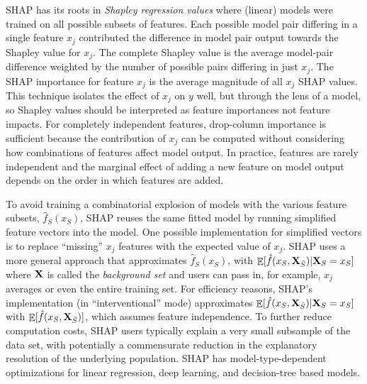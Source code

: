 \documentclass[11pt]{article}
\DeclareMathOperator{\Ex}{\mathbb{E}}
\begin{document}
SHAP has its roots in {\em Shapley regression values} \citep{shapley-regression} where (linear) models were trained on all possible subsets of features.  Each possible model pair differing in a single feature $x_j$ contributed the difference in model pair output towards the Shapley value for $x_j$. The complete Shapley value is the average model-pair difference weighted by the number of possible pairs differing in just $x_j$. The SHAP importance for feature $x_j$ is the average magnitude of all $x_j$ SHAP values.  This technique isolates the effect of $x_j$ on $y$ well, but through the lens of a model, so Shapley values should be interpreted as feature importances not feature impacts. For completely independent features, drop-column importance is sufficient because the contribution of $x_j$ can be computed without considering how combinations of features affect model output.  In practice, features are rarely independent and the marginal effect of adding a new feature on model output depends on the order in which features are added.  

To avoid training a combinatorial explosion of models with the various feature subsets, $\hat{f}_S(x_S)$, SHAP reuses the same fitted model by running simplified feature vectors into the model. One possible implementation for simplified vectors is to replace ``missing'' $x_j$ features with the expected value of $x_j$. SHAP uses a more general approach that approximates $\hat{f}_S(x_S)$, with $\Ex[\hat{f}(x_{S},{\bf X}_{\bar{S}}) | {\bf X}_S = x_S]$ where ${\bf X}$ is called the {\em background set} and users can pass in, for example, $x_j$ averages or even the entire training set.  For efficiency reasons, SHAP's implementation (in ``interventional'' mode)  approximates $\Ex[\hat{f}(x_{S},{\bf X}_{\bar{S}}) | {\bf X}_S = x_S]$ with $\Ex[\hat{f}(x_{S},{\bf X}_{\bar{S}})]$, which assumes feature independence.  To further reduce computation costs, SHAP users typically explain a very small subsample of the data set, with potentially a commensurate reduction in the explanatory resolution of the underlying population. SHAP has model-type-dependent optimizations for linear regression, deep learning, and decision-tree based models.
\end{document}
